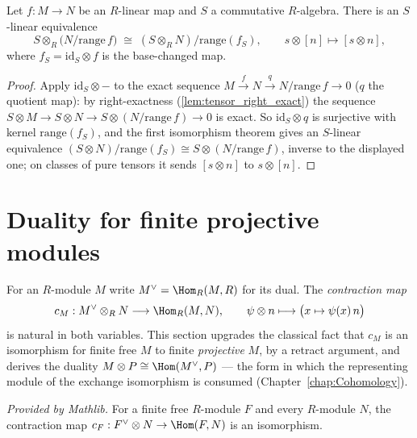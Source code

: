 \begin{theorem}
  \label{thm:quot_range_baseChange}
  \leanok
  Let \(f : M \to N\) be an \(R\)-linear map and \(S\) a commutative \(R\)-algebra.
  There is an \(S\)-linear equivalence
  \[
    S \otimes_R \bigl(N/\mathrm{range}\, f\bigr) \;\cong\;
      (S \otimes_R N)\big/\mathrm{range}(f_S), \qquad
    s \otimes [n] \longmapsto [s \otimes n],
  \]
  where \(f_S = \mathrm{id}_S \otimes f\) is the base-changed map.
\end{theorem}
\begin{proof}
  \leanok
  Apply \(\mathrm{id}_S \otimes -\) to the exact sequence
  \(M \xrightarrow{f} N \xrightarrow{q} N/\mathrm{range}\, f \to 0\) (\(q\) the quotient
  map): by right-exactness (\ref{lem:tensor_right_exact}) the sequence
  \(S \otimes M \to S \otimes N \to S \otimes (N/\mathrm{range}\, f) \to 0\) is exact.
  So \(\mathrm{id}_S \otimes q\) is surjective with kernel \(\mathrm{range}(f_S)\), and
  the first isomorphism theorem gives an \(S\)-linear equivalence
  \((S \otimes N)/\mathrm{range}(f_S) \cong S \otimes (N/\mathrm{range}\, f)\), inverse
  to the displayed one; on classes of pure tensors it sends \([s \otimes n]\) to
  \(s \otimes [n]\).
\end{proof}

\section{Duality for finite projective modules}
\label{sec:finite_projective_duality}

For an \(R\)-module \(M\) write \(M^{\vee} = \Hom_R(M, R)\) for its dual. The
\emph{contraction map}
\[
  c_M : M^{\vee} \otimes_R N \longrightarrow \Hom_R(M, N), \qquad
  \psi \otimes n \longmapsto \bigl(x \mapsto \psi(x)\, n\bigr)
\]
is natural in both variables. This section upgrades the classical fact that \(c_M\) is
an isomorphism for finite free \(M\) to finite \emph{projective} \(M\), by a retract
argument, and derives the duality \(M \otimes P \cong \Hom(M^{\vee}, P)\) --- the form
in which the representing module of the exchange isomorphism is consumed
(Chapter~\ref{chap:Cohomology}).

\begin{lemma}
  \label{lem:dualTensorHomEquiv_free}
  \mathlibok
  \textit{Provided by Mathlib.}
  For a finite free \(R\)-module \(F\) and every \(R\)-module \(N\), the contraction
  map \(c_F : F^{\vee} \otimes N \to \Hom(F, N)\) is an isomorphism.
\end{lemma}

